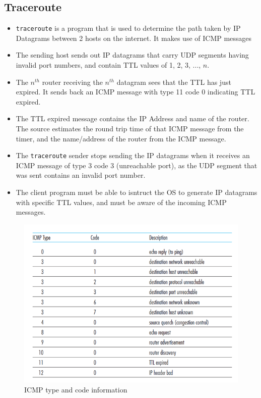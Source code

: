 \documentclass[a4paper]{article}
\theoremstyle{plain}
\theoremstyle{definition}
\begin{document}
\subsection{Traceroute}
\begin{itemize}
    \item \texttt{traceroute} is a program that is used to determine the path taken by IP Datagrams between 2 hosts on the internet. It makes use of ICMP messages
    
    \item The sending host sends out IP datagrams that carry UDP segments having invalid port numbers, and contain TTL values of 1, 2, 3, ..., $n$.
    
    \item The $n^{th}$ router receiving the $n^{th}$ datagram sees that the TTL has just expired. It sends back an ICMP message with type 11 code 0 indicating TTL expired. 
    
    \item The TTL expired message contains the IP Address and name of the router. The source estimates the round trip time of that ICMP message from the timer, and the name/address of the router from the ICMP message. 
    \item The \texttt{traceroute} sender stops sending the IP datagrams when it receives an ICMP message of type 3 code 3 (unreachable port), as the UDP segment that was sent contains an invalid port number. 
    
    \item The client program must be able to isntruct the OS to generate IP datagrams with specific TTL values, and must be aware of the incoming ICMP messages. 
\end{itemize}

\begin{figure}
    \centering
    \includegraphics[scale=0.6]{cn11.png}
    \caption{ICMP type and code information}
    \label{fig:my_label_11}
\end{figure}
\end{document}
